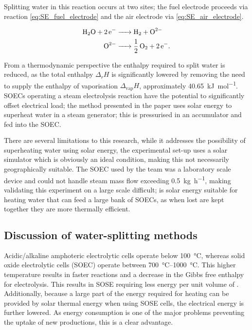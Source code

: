 Splitting water in this reaction occurs at two sites; the fuel electrode proceeds via reaction \eqref{eq:SE_fuel_electrode} and the air electrode via \eqref{eq:SE_air_electrode}.\cite{Schiller2019}

\begin{align}
	\ce{H2O + 2e- &-> H2 +O^2-}\label{eq:SE_fuel_electrode}\\
	\ce{O^2- &-> 1/2O2 + 2e-}\label{eq:SE_air_electrode}
.\end{align}

From a thermodynamic perspective the enthalpy required to split water is reduced, as the total enthalpy $\Delta_{r}H$ is significantly lowered by removing the need to supply the enthalpy of vaporisation $\Delta_{\text{vap}}H$, approximately \SI{40.65}{\kilo\joule\per\mole}\cite{Lemmon2017}.
SOECs operating a steam electrolysis reaction have the potential to significantly offset electrical load; the method presented in the paper uses solar energy to superheat water in a steam generator; this is pressurised in an accumulator and fed into the SOEC. 

There are several limitations to this research, while it addresses the possibility of superheating water using solar energy, the experimental set-up uses a solar simulator which is obviously an ideal condition, making this not necessarily geographically suitable.
The SOEC used by the team was a laboratory scale device and could not handle steam mass flow exceeding \SI{0.5}{\kilo\gram\per\hour}, making validating this experiment on a large scale difficult; is solar energy suitable for heating water that can feed a large bank of SOECs, as when lost are kept together they are more thermally efficient.


\subsection{Discussion of water-splitting methods}%
\label{sub:discussion_of_water_splitting_methods}

Acidic/alkaline amphoteric  electrolytic cells operate below \SI{100}{\celsius}\cite{Lei2019}, whereas solid oxide electrolytic cells (SOEC) operate between \SIrange{700}{1000}{\celsius}\cite{Schiller2019}.
This higher temperature results in faster reactions and a decrease in the Gibbs free enthalpy for  electrolysis. This results in SOSE requiring less energy per unit volume of . Additionally, because a large part of the energy required for heating can be provided by solar thermal energy when using SOSE cells, the electrical energy is further lowered. As energy consumption is one of the major problems preventing the uptake of new  productions, this is a clear advantage.

